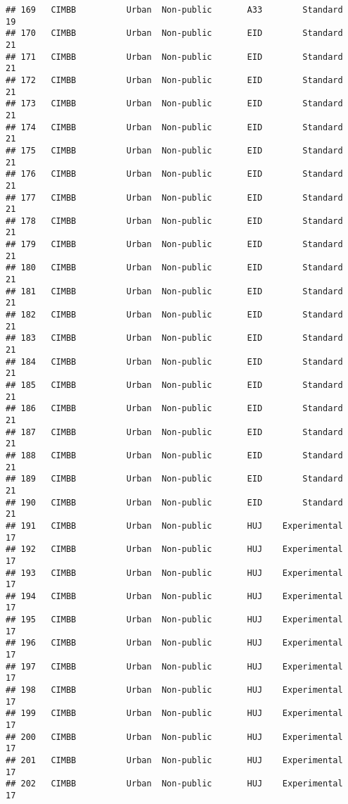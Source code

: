 \documentclass[
]{article}
\begin{document}
\begin{verbatim}
## 169   CIMBB          Urban  Non-public       A33        Standard        19
## 170   CIMBB          Urban  Non-public       EID        Standard        21
## 171   CIMBB          Urban  Non-public       EID        Standard        21
## 172   CIMBB          Urban  Non-public       EID        Standard        21
## 173   CIMBB          Urban  Non-public       EID        Standard        21
## 174   CIMBB          Urban  Non-public       EID        Standard        21
## 175   CIMBB          Urban  Non-public       EID        Standard        21
## 176   CIMBB          Urban  Non-public       EID        Standard        21
## 177   CIMBB          Urban  Non-public       EID        Standard        21
## 178   CIMBB          Urban  Non-public       EID        Standard        21
## 179   CIMBB          Urban  Non-public       EID        Standard        21
## 180   CIMBB          Urban  Non-public       EID        Standard        21
## 181   CIMBB          Urban  Non-public       EID        Standard        21
## 182   CIMBB          Urban  Non-public       EID        Standard        21
## 183   CIMBB          Urban  Non-public       EID        Standard        21
## 184   CIMBB          Urban  Non-public       EID        Standard        21
## 185   CIMBB          Urban  Non-public       EID        Standard        21
## 186   CIMBB          Urban  Non-public       EID        Standard        21
## 187   CIMBB          Urban  Non-public       EID        Standard        21
## 188   CIMBB          Urban  Non-public       EID        Standard        21
## 189   CIMBB          Urban  Non-public       EID        Standard        21
## 190   CIMBB          Urban  Non-public       EID        Standard        21
## 191   CIMBB          Urban  Non-public       HUJ    Experimental        17
## 192   CIMBB          Urban  Non-public       HUJ    Experimental        17
## 193   CIMBB          Urban  Non-public       HUJ    Experimental        17
## 194   CIMBB          Urban  Non-public       HUJ    Experimental        17
## 195   CIMBB          Urban  Non-public       HUJ    Experimental        17
## 196   CIMBB          Urban  Non-public       HUJ    Experimental        17
## 197   CIMBB          Urban  Non-public       HUJ    Experimental        17
## 198   CIMBB          Urban  Non-public       HUJ    Experimental        17
## 199   CIMBB          Urban  Non-public       HUJ    Experimental        17
## 200   CIMBB          Urban  Non-public       HUJ    Experimental        17
## 201   CIMBB          Urban  Non-public       HUJ    Experimental        17
## 202   CIMBB          Urban  Non-public       HUJ    Experimental        17

\end{verbatim}
\end{document}

